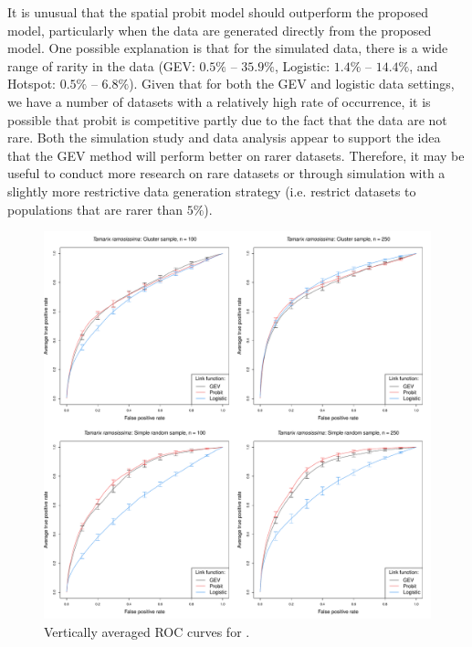 It is unusual that the spatial probit model should outperform the proposed model, particularly when the data are generated directly from the proposed model.
One possible explanation is that for the simulated data, there is a wide range of rarity in the data (GEV: $0.5\%$ -- $35.9\%$, Logistic: $1.4\%$ -- $14.4\%$, and Hotspot: $0.5\%$ -- $6.8\%$).
Given that for both the GEV and logistic data settings, we have a number of datasets with a relatively high rate of occurrence, it is possible that probit is competitive partly due to the fact that the data are not rare.
Both the simulation study and data analysis appear to support the idea that the GEV method will perform better on rarer datasets.
Therefore, it may be useful to conduct more research on rare datasets or through simulation with a slightly more restrictive data generation strategy (i.e. restrict datasets to populations that are rarer than $5\%$).

\begin{figure}
	\includegraphics[width=\linewidth]{plots/data-perf-species1}
	\caption{Vertically averaged ROC curves for \tamarix{}.}
	\label{rbfig:data1roc}
\end{figure}

